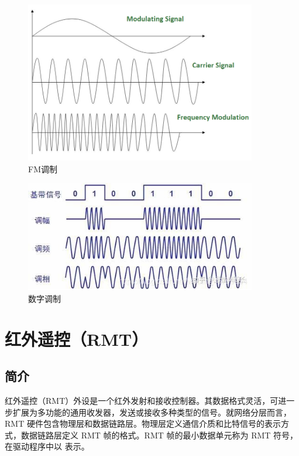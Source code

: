 \documentclass[lang=cn,newtx,10pt,scheme=chinese]{elegantbook}
\begin{document}
\begin{figure}[!htb]
\centering
\includegraphics[width=0.9\textwidth]{Frequency_Modulation.png}
\caption{FM调制}
\label{fig:FM-Modulation}
\end{figure}

\begin{figure}[!htb]
\centering
\includegraphics[width=0.9\textwidth]{RMT-4.png}
\caption{数字调制}
\end{figure}

\chapter{红外遥控（RMT）}

\section{简介}

红外遥控（RMT）外设是一个红外发射和接收控制器。其数据格式灵活，可进一步扩展为多功能的通用收发器，发送或接收多种类型的信号。就网络分层而言，RMT 硬件包含物理层和数据链路层。物理层定义通信介质和比特信号的表示方式，数据链路层定义 RMT 帧的格式。RMT 帧的最小数据单元称为 RMT 符号，在驱动程序中以  表示。
\end{document}
